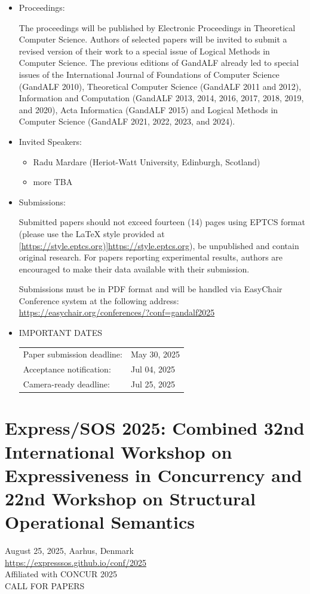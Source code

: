 \documentclass[prodmode,acmtecs]{acmsmall} %
\begin{document}
\begin{itemize}\item  Proceedings: 
 
  The proceedings will be published by Electronic Proceedings in Theoretical Computer Science. Authors of selected papers will be invited to submit a revised version of their work to a special issue of Logical Methods in Computer Science. The previous editions of GandALF already led to special issues of the International Journal of Foundations of Computer Science (GandALF 2010), Theoretical Computer Science (GandALF 2011 and 2012), Information and Computation (GandALF 2013, 2014, 2016, 2017, 2018, 2019, and 2020), Acta Informatica (GandALF 2015) and Logical Methods in Computer Science (GandALF 2021, 2022, 2023, and 2024). 
 
\item  Invited Speakers: 
 
\begin{itemize}\item  Radu Mardare (Heriot-Watt University, Edinburgh, Scotland)
\item  more TBA
\end{itemize} 
\item  Submissions: 
 
  Submitted papers should not exceed fourteen (14) pages using EPTCS format (please use the LaTeX style provided at [\href{https://style.eptcs.org)]https://style.eptcs.org}{https://style.eptcs.org)]https://style.eptcs.org}), be unpublished and contain original research. For papers reporting experimental results, authors are encouraged to make their data available with their submission. 
 
  Submissions must be in PDF format and will be handled via EasyChair Conference system at the following address: \href{https://easychair.org/conferences/?conf=gandalf2025}{https://easychair.org/conferences/?conf=gandalf2025} 
 
\item  IMPORTANT DATES 
 
\begin{tabulary}{\linewidth}{LL}Paper submission deadline:  & May 30, 2025 \\
Acceptance notification:  & Jul 04, 2025 \\
Camera-ready deadline:  & Jul 25, 2025 \\
\end{tabulary}
 
\end{itemize}\section{Express/SOS 2025: Combined 32nd International Workshop on Expressiveness in Concurrency and 22nd Workshop on Structural Operational Semantics}\label{ExpressSOS2025}  August 25, 2025, Aarhus, Denmark\\ 
  \href{https://expresssos.github.io/conf/2025}{https://expresssos.github.io/conf/2025}\\ 
  Affiliated with CONCUR 2025\\ 
CALL FOR PAPERS 
\end{document}
